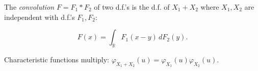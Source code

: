 The \textit{convolution} $F = F_1 * F_2$ of two d.f.'s is the d.f. of $X_1 + X_2$ where $X_1, X_2$ are independent with d.f.'s $F_1, F_2$:

$$F(x) = \int_{\mathbb{R}} F_1(x - y) \, dF_2(y).$$

Characteristic functions multiply: $\varphi_{X_1+X_2}(u) = \varphi_{X_1}(u) \varphi_{X_2}(u)$.

